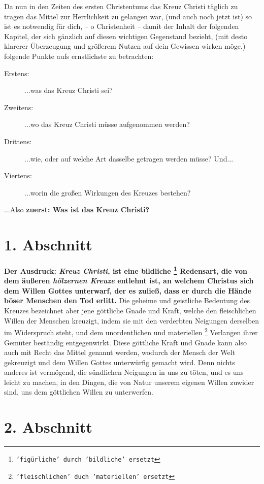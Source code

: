 Da nun in den Zeiten des ersten Christentums das Kreuz Christi täglich zu
tragen das Mittel zur Herrlichkeit zu gelangen war, (und auch noch jetzt ist)
so ist es notwendig für dich, -- o Christenheit -- damit der Inhalt der folgenden
Kapitel, der sich gänzlich auf diesen wichtigen Gegenstand bezieht, (mit desto
klarerer Überzeugung und größerem Nutzen auf dein Gewissen wirken möge,)
folgende Punkte aufs ernstlichste zu betrachten:
\begin{description}
\item[Erstens:] ...was das Kreuz Christi sei?
\item[Zweitens:] ...wo das Kreuz Christi müsse aufgenommen werden?
\item[Drittens:] ...wie, oder auf welche Art dasselbe getragen werden müsse? Und...
\item[Viertens:] ...worin die großen Wirkungen des Kreuzes bestehen?
\end{description}

...Also \textbf{zuerst: Was ist das Kreuz Christi?}


\section{1. Abschnitt} \label{kap3_ab1}

\label{ref:03_01_das_kreuz}
\textbf{Der Ausdruck: \textit{Kreuz Christi}, ist eine bildliche
\footnote{\texttt{'figürliche' durch 'bildliche' ersetzt}} Redensart, die von dem äußeren
\textit{hölzernen Kreuze} entlehnt ist, an welchem
 Christus sich dem Willen Gottes
unterwarf, der es zuließ, dass er durch die Hände böser Menschen den Tod erlitt.}
Die geheime und geistliche Bedeutung des Kreuzes bezeichnet aber jene göttliche
Gnade und Kraft, welche den fleischlichen Willen der Menschen kreuzigt, indem
sie mit den verderbten Neigungen derselben im Widerspruch steht, und dem
unordentlichen und materiellen
\footnote{\texttt{'fleischlichen' duch 'materiellen' ersetzt}} Verlangen ihrer Gemüter beständig
entgegenwirkt. Diese göttliche Kraft und Gnade kann also auch mit Recht das
Mittel genannt werden, wodurch der Mensch der Welt gekreuzigt und dem Willen
Gottes unterwürfig gemacht wird. Denn nichts anderes ist vermögend, die
sündlichen Neigungen in uns zu töten, und es uns leicht zu machen, in den
Dingen, die von Natur unserem eigenen Willen zuwider sind, uns dem göttlichen
Willen zu unterwerfen.

\section{2. Abschnitt} \label{kap3_ab2}

